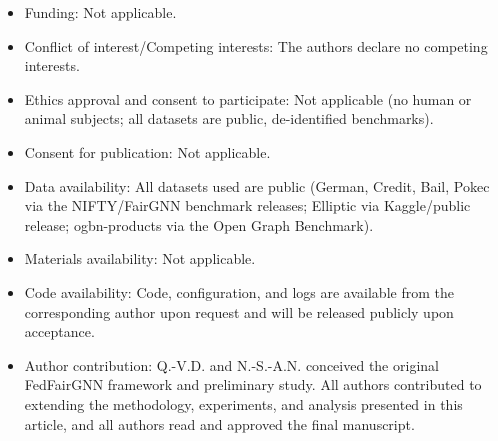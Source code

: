 \documentclass[pdflatex,sn-mathphys-num]{sn-jnl}
\theoremstyle{thmstyleone}%
\theoremstyle{thmstyletwo}%
\theoremstyle{thmstylethree}%
\begin{document}
\begin{itemize}
\item Funding: Not applicable.
\item Conflict of interest/Competing interests: The authors declare no competing interests.
\item Ethics approval and consent to participate: Not applicable (no human or animal subjects; all datasets are public, de-identified benchmarks).
\item Consent for publication: Not applicable.
\item Data availability: All datasets used are public (German, Credit, Bail, Pokec via the NIFTY/FairGNN benchmark releases; Elliptic via Kaggle/public release; ogbn-products via the Open Graph Benchmark).
\item Materials availability: Not applicable.
\item Code availability: Code, configuration, and logs are available from the corresponding author upon request and will be released publicly upon acceptance.
\item Author contribution: Q.-V.D. and N.-S.-A.N. conceived the original FedFairGNN framework and preliminary study. All authors contributed to extending the methodology, experiments, and analysis presented in this article, and all authors read and approved the final manuscript.
\end{itemize}
\end{document}
